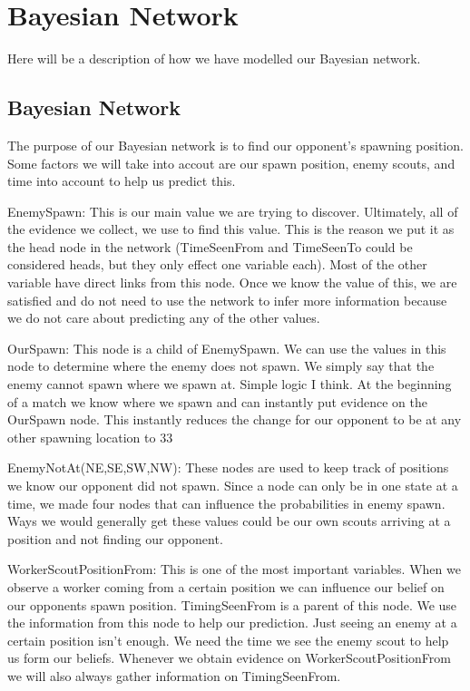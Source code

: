 \section{Bayesian Network}\label{bayesian_network}

Here will be a description of how we have modelled our Bayesian network.

\subsection*{Bayesian Network}			 
			
The purpose of our Bayesian network is to find our opponent's spawning position. Some factors we will take into accout are our spawn position, enemy scouts, and time into account to help us predict this.

EnemySpawn: This is our main value we are trying to discover. Ultimately, all of the evidence we collect, we use to find this value. This is the reason we put it as the head node in the network (TimeSeenFrom and TimeSeenTo could be considered heads, but they only effect one variable each). Most of the other variable have direct links from this node. Once we know the value of this, we are satisfied and do not need to use the network to infer more information because we do not care about predicting any of the other values.

OurSpawn: This node is a child of EnemySpawn. We can use the values in this node to determine where the enemy does not spawn. We simply say that the enemy cannot spawn where we spawn at. Simple logic I think. At the beginning of a match we know where we spawn and can instantly put evidence on the OurSpawn node. This instantly reduces the change for our opponent to be at any other spawning location to 33%
 
EnemyNotAt(NE,SE,SW,NW): These nodes are used to keep track of positions we know our opponent did not spawn. Since a node can only be in one state at a time, we made four nodes that can influence the probabilities in enemy spawn. Ways we would generally get these values could be our own scouts arriving at a position and not finding our opponent.

WorkerScoutPositionFrom: This is one of the most important variables. When we observe a worker coming from a certain position we can influence our belief on our opponents spawn position. TimingSeenFrom is a parent of this node. We use the information from this node to help our prediction. Just seeing an enemy at a certain position isn't enough. We need the time we see the enemy scout to help us form our beliefs. Whenever we obtain evidence on WorkerScoutPositionFrom we will also always gather information on TimingSeenFrom.

